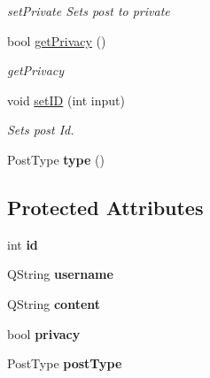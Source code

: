 \begin{DoxyCompactItemize}
\begin{DoxyCompactList}\small\item\em set\+Private Sets post to private \end{DoxyCompactList}\item 
bool \hyperlink{classPost_ad86af22dad64bd7a5ef2611f00309f8e}{get\+Privacy} ()
\begin{DoxyCompactList}\small\item\em get\+Privacy \end{DoxyCompactList}\item 
void \hyperlink{classPost_aa9ae3fe999271bfc7d811d573a00f1d8}{set\+ID} (int input)
\begin{DoxyCompactList}\small\item\em Sets post Id. \end{DoxyCompactList}\item 
Post\+Type {\bfseries type} ()\hypertarget{classPost_a80f2ae3c95997a20f107bc80204c50cc}{}\label{classPost_a80f2ae3c95997a20f107bc80204c50cc}

\end{DoxyCompactItemize}
\subsection*{Protected Attributes}
\begin{DoxyCompactItemize}
\item 
int {\bfseries id}\hypertarget{classPost_aafa50b170bbe10c9bbe3ce77ce8c79e6}{}\label{classPost_aafa50b170bbe10c9bbe3ce77ce8c79e6}

\item 
Q\+String {\bfseries username}\hypertarget{classPost_aa945913af695a5de5e88f630481cd7c2}{}\label{classPost_aa945913af695a5de5e88f630481cd7c2}

\item 
Q\+String {\bfseries content}\hypertarget{classPost_abb97710dd70ea1291150d26b63050899}{}\label{classPost_abb97710dd70ea1291150d26b63050899}

\item 
bool {\bfseries privacy}\hypertarget{classPost_a44ef3134dacbf0c4fa779b6eaa1ab701}{}\label{classPost_a44ef3134dacbf0c4fa779b6eaa1ab701}

\item 
Post\+Type {\bfseries post\+Type}\hypertarget{classPost_a319fc77e683be3c64f6260b3b52f630e}{}\label{classPost_a319fc77e683be3c64f6260b3b52f630e}

\end{DoxyCompactItemize}
